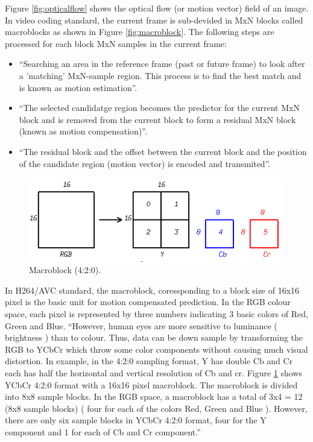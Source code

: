 Figure \ref{fig:opticalflow} shows the optical flow (or motion vector) field of an image.\\
 In video coding standard, the current frame is sub-devided in MxN blocks called macroblocks as shown in Figure \ref{fig:macroblock}. The following steps are processed for each block MxN samples in the current frame:
\begin{itemize}
\item “Searching an area in the reference frame (past or future frame) to look after a 'matching' MxN-sample region. This process is to find the best match and is known as motion estimation”.
\item “The selected candidatge region becomes the predictor for the current MxN block and is removed from the current block to form a residual MxN block (known as motion compensation)”.
\item “The residual block and the offset between the current block and the position of the candidate region (motion vector) is encoded and transmited”. 
\end{itemize}
\begin{figure}
\centering
 \includegraphics[width=0.8\linewidth]{Figures/yuv420.png}
 \caption{Macroblock (4:2:0).}
 \label{fig:yuv420}
\end{figure}
	In H264/AVC standard, the macroblock, coressponding to a block size of 16x16 pixel is the basic unit for motion compensated prediction. In the RGB colour space, each pixel is represented by three numbers indicating 3 basic colors of Red, Green and Blue. “However, human eyes are more sensitive to luminance ( brightness ) than to colour. Thus, data can be down sample by transforming the RGB to YCbCr which throw some color components without causing much visual distortion. In example, in the 4:2:0 sampling format, Y has double Cb and Cr each has half the horizontal and vertical resolution of Cb and cr. Figure \ref{fig:yuv420} shows YCbCr 4:2:0 format with a 16x16 pixel macroblock. The macroblock is divided into 8x8 sample blocks. In the RGB space, a macroblock has a total of 3x4 = 12 (8x8 sample blocks) ( four for each of the colors Red, Green and Blue ). However, there are only six sample blocks in YCbCr 4:2:0 format, four for the Y component and 1 for each of Cb and Cr component.”\\
